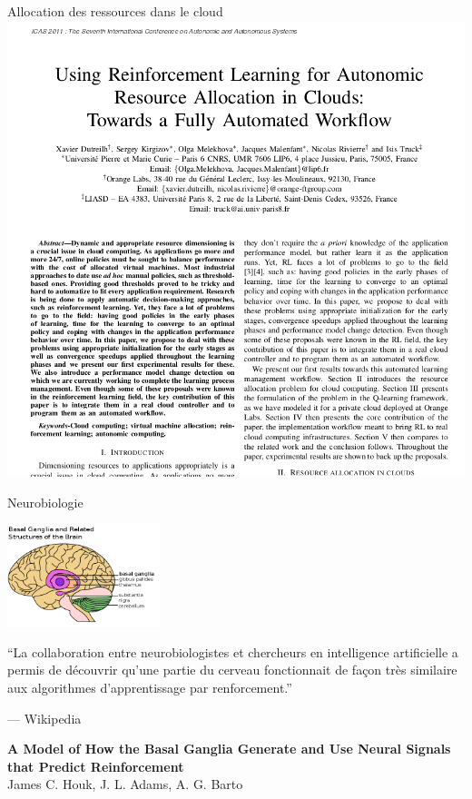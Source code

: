 \documentclass{beamer}
\begin{document}
\begin{frame}{Allocation des ressources dans le cloud}
  \includegraphics[width=\textwidth]{figs/mypaper.png}
\end{frame}


\begin{frame}{Neurobiologie}

  \begin{center}
    \includegraphics[width=12em]{figs/ganglions-de-base.png}
  \end{center}

  ``La collaboration entre neurobiologistes et chercheurs en
  intelligence artificielle a permis de découvrir qu'une partie du
  cerveau fonctionnait de façon très similaire aux algorithmes
  d'apprentissage par renforcement.'' 

  \hfill \scriptsize --- Wikipedia

  \vspace{1em}

  {\bf A Model of How the Basal Ganglia Generate and Use Neural Signals that Predict Reinforcement}  \\
  \hfill James C. Houk,  J. L. Adams, A. G. Barto



\end{frame}
\end{document}
